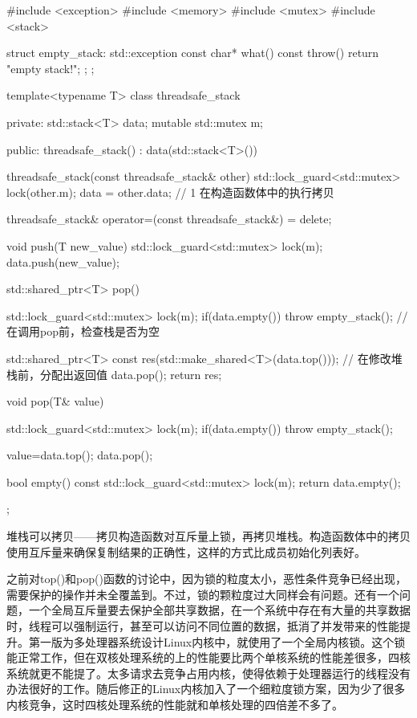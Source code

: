 \begin{cpp}
#include <exception>
#include <memory>
#include <mutex>
#include <stack>

struct empty_stack: std::exception
{
  const char* what() const throw() {
	return "empty stack!";
  };
};

template<typename T>
class threadsafe_stack
{
private:
  std::stack<T> data;
  mutable std::mutex m;

public:
  threadsafe_stack()
	: data(std::stack<T>()){}

  threadsafe_stack(const threadsafe_stack& other)
  {
    std::lock_guard<std::mutex> lock(other.m);
    data = other.data; // 1 在构造函数体中的执行拷贝
  }

  threadsafe_stack& operator=(const threadsafe_stack&) = delete;

  void push(T new_value)
  {
    std::lock_guard<std::mutex> lock(m);
    data.push(new_value);
  }

  std::shared_ptr<T> pop()
  {
    std::lock_guard<std::mutex> lock(m);
    if(data.empty()) throw empty_stack(); // 在调用pop前，检查栈是否为空

    std::shared_ptr<T> const res(std::make_shared<T>(data.top())); // 在修改堆栈前，分配出返回值
    data.pop();
    return res;
  }

  void pop(T& value)
  {
    std::lock_guard<std::mutex> lock(m);
    if(data.empty()) throw empty_stack();

    value=data.top();
    data.pop();
  }

  bool empty() const
  {
    std::lock_guard<std::mutex> lock(m);
    return data.empty();
  }
};
\end{cpp}

堆栈可以拷贝——拷贝构造函数对互斥量上锁，再拷贝堆栈。构造函数体中的拷贝使用互斥量来确保复制结果的正确性，这样的方式比成员初始化列表好。

之前对top()和pop()函数的讨论中，因为锁的粒度太小，恶性条件竞争已经出现，需要保护的操作并未全覆盖到。不过，锁的颗粒度过大同样会有问题。还有一个问题，一个全局互斥量要去保护全部共享数据，在一个系统中存在有大量的共享数据时，线程可以强制运行，甚至可以访问不同位置的数据，抵消了并发带来的性能提升。第一版为多处理器系统设计Linux内核中，就使用了一个全局内核锁。这个锁能正常工作，但在双核处理系统的上的性能要比两个单核系统的性能差很多，四核系统就更不能提了。太多请求去竞争占用内核，使得依赖于处理器运行的线程没有办法很好的工作。随后修正的Linux内核加入了一个细粒度锁方案，因为少了很多内核竞争，这时四核处理系统的性能就和单核处理的四倍差不多了。

